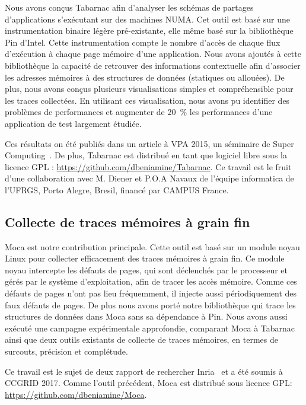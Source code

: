 Nous avons conçus \gls{Tabarnac} afin d'analyser les schémas de partages d'applications s'exécutant sur des machines NUMA.
Cet outil est basé sur une instrumentation binaire légère pré-existante, elle même basé sur la bibliothèque \gls{Pin} d'\gls{Intel}.
Cette instrumentation compte le nombre d'accès de chaque flux d'exécution à chaque page mémoire d'une application.
Nous avons ajoutés à cette bibliothèque la capacité de retrouver des informations contextuelle afin d'associer les adresses mémoires à des structures de données (statiques ou allouées).
De plus, nous avons conçus plusieurs visualisations simples et compréhensible pour les traces collectées.
En utilisant ces visualisation, nous avons pu identifier des problèmes de performances et augmenter de \SI{20}{\%} les performances d'une application de test largement étudiée.

Ces résultats on été publiés dans un article à \gls{VPA} 2015, un séminaire de Super Computing~\cite{Beniamine15TABARNAC}.
De plus, \gls{Tabarnac} est distribué en tant que logiciel libre sous la licence \gls{GPL} : \url{https://github.com/dbeniamine/Tabarnac}.
Ce travail est le fruit d'une collaboration avec M. Diener et P.O.A Navaux de l'équipe informatica de l'\gls{UFRGS}, Porto Alegre, Bresil, financé par CAMPUS France.

\subsection*{Collecte de traces mémoires à grain fin}

\gls{Moca} est notre contribution principale.
Cette outil est basé sur un module noyau \gls{Linux} pour collecter efficacement des traces mémoires à grain fin.
Ce module noyau intercepte les défauts de pages, qui sont déclenchés par le processeur et gérés par le système d'exploitation, afin de tracer les accès mémoire.
Comme ces défauts de pages n'ont pas lieu fréquemment, il injecte aussi périodiquement des faux défauts de pages.
De plus nous avons porté notre bibliothèque qui trace les structures de données dans \gls{Moca} sans sa dépendance à \gls{Pin}.
Nous avons aussi exécuté une campagne expérimentale approfondie, comparant \gls{Moca} à \gls{Tabarnac} ainsi que deux outils existants de collecte de traces mémoires, en termes de surcouts, précision et complétude.

Ce travail est le sujet de deux rapport de rechercher Inria~\cite{Beniamine15Memory,Beniamine16Moca} et a été soumis à \gls{CCGRID} 2017.
Comme l'outil précédent, \gls{Moca} est distribué sous licence \gls{GPL}:\\
\url{https://github.com/dbeniamine/Moca}.


